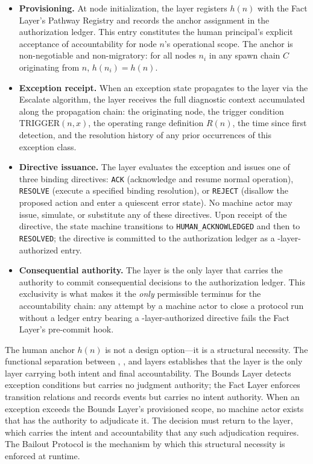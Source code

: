 \begin{itemize}\itemsep=0pt
\item[(\textit{i})] \textbf{Provisioning.} At node initialization, the \purpose{} layer registers $h(n)$ with the Fact Layer's Pathway Registry and records the anchor assignment in the authorization ledger. This entry constitutes the human principal's explicit acceptance of accountability for node $n$'s operational scope. The anchor is non-negotiable and non-migratory: for all nodes $n_i$ in any spawn chain $C$ originating from $n$, $h(n_i) = h(n)$.

\item[(\textit{ii})] \textbf{Exception receipt.} When an exception state propagates to the \purpose{} layer via the Escalate algorithm, the \purpose{} layer receives the full diagnostic context accumulated along the propagation chain: the originating node, the trigger condition $\text{TRIGGER}(n, x)$, the operating range definition $R(n)$, the time since first detection, and the resolution history of any prior occurrences of this exception class.

\item[(\textit{iii})] \textbf{Directive issuance.} The \purpose{} layer evaluates the exception and issues one of three binding directives: \texttt{ACK} (acknowledge and resume normal operation), \texttt{RESOLVE} (execute a specified binding resolution), or \texttt{REJECT} (disallow the proposed action and enter a quiescent error state). No machine actor may issue, simulate, or substitute any of these directives. Upon receipt of the directive, the state machine transitions to \texttt{HUMAN\_ACKNOWLEDGED} and then to \texttt{RESOLVED}; the directive is committed to the authorization ledger as a \purpose-layer-authorized entry.

\item[(\textit{iv})] \textbf{Consequential authority.} The \purpose{} layer is the only layer that carries the authority to commit consequential decisions to the authorization ledger. This exclusivity is what makes it the \emph{only} permissible terminus for the accountability chain: any attempt by a machine actor to close a protocol run without a ledger entry bearing a \purpose-layer-authorized directive fails the Fact Layer's pre-commit hook.
\end{itemize}

The human anchor $h(n)$ is not a design option---it is a structural necessity. The functional separation between \purpose{}, \bounds{}, and \fact{} layers establishes that the \purpose{} layer is the only layer carrying both intent and final accountability. The Bounds Layer detects exception conditions but carries no judgment authority; the Fact Layer enforces transition relations and records events but carries no intent authority. When an exception exceeds the Bounds Layer's provisioned scope, no machine actor exists that has the authority to adjudicate it. The decision must return to the \purpose{} layer, which carries the intent and accountability that any such adjudication requires. The Bailout Protocol is the mechanism by which this structural necessity is enforced at runtime.


